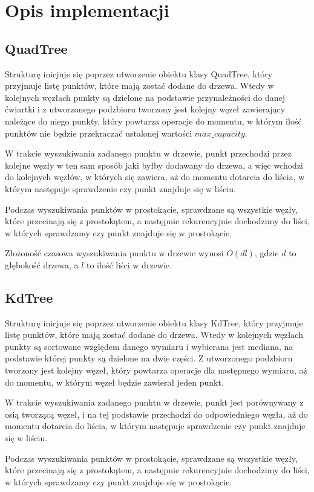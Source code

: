 \documentclass{lab}
\begin{document}
\section{Opis implementacji}
\subsection{QuadTree}
Strukturę inicjuje się poprzez utworzenie obiektu klasy QuadTree, który przyjmuje listę punktów, które mają zostać dodane do drzewa.
Wtedy w kolejnych węzłach punkty są dzielone na podstawie przynależności do danej ćwiartki i z utworzonego podzbioru tworzony jest kolejny węzeł zawierający należące do niego punkty, 
który powtarza operacje do momentu, w którym ilość punktów nie będzie przekraczać ustalonej wartości $max\_capacity$.

W trakcie wyszukiwania zadanego punktu w drzewie, punkt przechodzi przez kolejne węzły w ten sam sposób jaki byłby dodawany do drzewa, a więc wchodzi do kolejnych węzłów, w których się zawiera, aż do momentu dotarcia do liścia,
w którym następuje sprawdzenie czy punkt znajduje się w liściu.

Podczas wyszukiwania punktów w prostokącie, sprawdzane są wszystkie węzły, które przecinają się z prostokątem, a następnie rekurencyjnie dochodzimy do liści,
w których sprawdzamy czy punkt znajduje się w prostokącie.

Złożoność czasowa wyszukiwania punktu w drzewie wynosi $O(dl)$, gdzie $d$ to głębokość drzewa, a $l$ to ilość liści w drzewie.

\subsection{KdTree}
Strukturę inicjuje się poprzez utworzenie obiektu klasy KdTree, który przyjmuje listę punktów, które mają zostać dodane do drzewa.
Wtedy w kolejnych węzłach punkty są sortowane względem danego wymiaru i wybierana jest mediana, na podstawie której punkty są dzielone na dwie części.
Z utworzonego podzbioru tworzony jest kolejny węzeł, który powtarza operacje dla następnego wymiaru, aż do momentu, w którym węzeł będzie zawierał jeden punkt.

W trakcie wyszukiwania zadanego punktu w drzewie, punkt jest porównywany z osią tworzącą węzeł, i na tej podstawie przechodzi do odpowiedniego węzła,
aż do momentu dotarcia do liścia, w którym następuje sprawdzenie czy punkt znajduje się w liściu.

Podczas wyszukiwania punktów w prostokącie, sprawdzane są wszystkie węzły, które przecinają się z prostokątem, a następnie rekurencyjnie dochodzimy do liści,
w których sprawdzamy czy punkt znajduje się w prostokącie.
\end{document}
